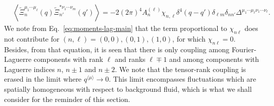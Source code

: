 \documentclass[aps,prd,preprint,nofootinbib,amsmath,amssymb,showpacs,longbibliography,singlecolumn,superscriptaddress,10pt]{revtex4-1}
\theoremstyle{plain}
\theoremstyle{definition}
\begin{document}
%
%
\begin{equation}
\label{eq:XiXi-corr}
\begin{aligned}
&
\left\langle \widetilde{\Xi}_{n}^{\mu_{1} \cdots \mu_{\ell}}(q) \widetilde{\Xi}_{n'}^{*\nu_{1} \cdots \nu_{m}}(q')
\right\rangle
= 
-
2 (2 \pi)^{4} A_{n}^{(\ell)} \chi_{n,\ell}  \delta^{4}(q-q') \delta_{\ell m} \delta_{nn'} \Delta^{\mu_{1} \cdots \mu_{\ell}\nu_{1} \cdots \nu_{\ell}}.
\end{aligned}    
\end{equation}
%
We note from Eq.~\eqref{eq:moments-lag-main} that the term proportional to $\chi_{n\ell}$ does not contribute for $(n,\ell) = (0,0), (0,1), (1,0)$, for which $\chi_{n\ell} = 0$. Besides, from that equation, it is seen  that there is only coupling among Fourier-Laguerre components with rank $\ell$ and ranks $\ell \mp 1$ and among components with Laguerre indices $n$, $n \pm 1$ and $n \pm 2$. We note that the tensor-rank coupling is erased in the limit where $q^{\langle \mu \rangle} \to 0$. This limit encompasses fluctuations which are spatially homogeneous with respect to background fluid, which is what we shall consider for the reminder of this section.
\end{document}
